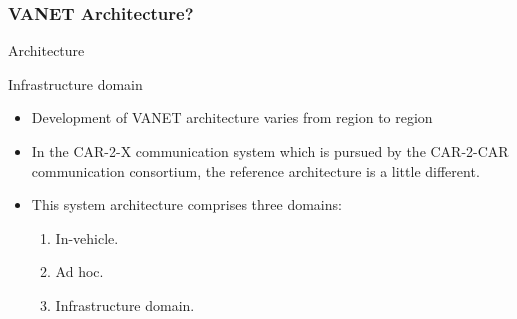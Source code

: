 \documentclass{beamer}
\begin{document}
\begin{frame}
	
	\frametitle{VANET Architecture?}
	\begin{block}{Architecture}
		\begin{block}{Infrastructure domain}
			\begin{itemize}
			    	\item Development of VANET architecture varies from region to region
				\item In the CAR-2-X communication system which is pursued by the CAR-2-CAR communication consortium, the reference architecture is a little different.\\
				\item This system architecture comprises three domains:
				\begin{enumerate}
					\item In-vehicle. 
					\item Ad hoc.
					\item Infrastructure domain.
					
				\end{enumerate}
				
			\end{itemize}
		\end{block}
	\end{block}
	
\end{frame}

\end{document}
